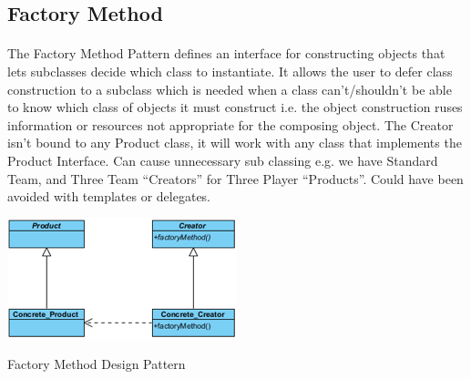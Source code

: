 \subsection{Factory Method}	
	\vspace{3 mm}
	\begin{multicols}{2}
	\paragraph{}
		The Factory Method Pattern defines an interface for constructing objects that lets subclasses decide which class to instantiate. It allows 
		the user to defer class construction to a subclass which is needed when a class can’t/shouldn’t be able to know which class of objects it 
		must construct i.e. the object construction ruses information or resources not appropriate for the composing object.
		\newline
		\newline
		The Creator isn’t bound to any Product class, it will work with any class that implements the Product Interface. Can cause unnecessary 
		sub classing e.g. we have Standard Team, and Three Team “Creators” for Three Player “Products”. Could have been avoided with templates 
		or delegates.
		\newline
		\newline
		\begin{figurehere}
			\includegraphics[scale=0.65]{figures/factory.png}
			\caption{Factory Method Design Pattern}
		\end{figurehere}
		
	\end{multicols}
	
\newpage
